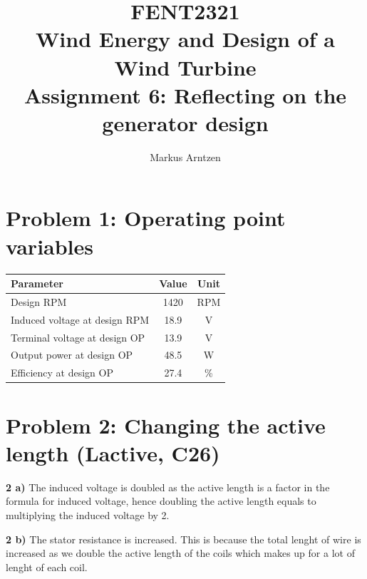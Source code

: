 \documentclass[11pt,a4paper]{article}
\title{
    \textbf{FENT2321}\\[0.3cm]
    Wind Energy and Design of a Wind Turbine\\[0.5cm]
    \Large Assignment 6: Reflecting on the generator design
}
\author{Markus Arntzen}
\date{}
\begin{document}
\maketitle
\thispagestyle{empty}

\clearpage
\tableofcontents
\clearpage


\section*{Problem 1: Operating point variables}

\setlength{\tabcolsep}{1em}
\renewcommand{\arraystretch}{1.5}
\begin{table}[h]
    \centering
    \begin{tabular}{| l |c|c|}
        \hline
        \textbf{Parameter} & \textbf{Value} & \textbf{Unit} \\
        \hline
        Design RPM & 1420 & RPM \\
        \hline
        Induced voltage at design RPM & 18.9 & V \\
        \hline
        Terminal voltage at design OP & 13.9 & V \\
        \hline
        Output power at design OP & 48.5 & W \\
        \hline
        Efficiency at design OP & 27.4 & \% \\
        \hline
    \end{tabular}
\end{table}

\vspace{1.5cm}

\section*{Problem 2: Changing the active length (Lactive, C26)}

\textbf{2 a)} The induced voltage is doubled as the active length is a factor in the formula
for induced voltage, hence doubling the active length equals to multiplying the induced voltage by 2.
\newline

\textbf{2 b)} The stator resistance is increased. This is because the total lenght of wire is increased
as we double the active length of the coils which makes up for a lot of lenght of each coil.
\newline
\end{document}
